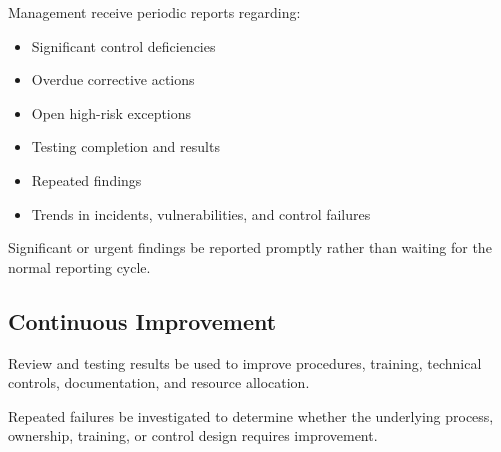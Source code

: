 Management \should{} receive periodic reports regarding:
\begin{itemize}
    \item Significant control deficiencies
    \item Overdue corrective actions
    \item Open high-risk exceptions
    \item Testing completion and results
    \item Repeated findings
    \item Trends in incidents, vulnerabilities, and control failures
\end{itemize}

Significant or urgent findings \must{} be reported promptly rather than waiting for the normal reporting cycle.

\subsection{Continuous Improvement}

Review and testing results \should{} be used to improve procedures, training, technical controls, documentation, and resource allocation.

Repeated failures \must{} be investigated to determine whether the underlying process, ownership, training, or control design requires improvement.
